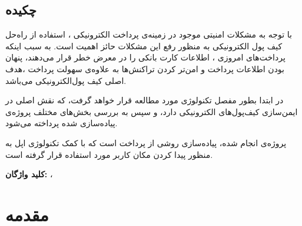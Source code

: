 \documentclass{book}
\begin{document}
 
 \section*{چکیده}
\Large \noindent
با توجه به مشکلات امنیتی موجود در زمینه‌ی پرداخت الکترونیکی ، استفاده از راه‌حل‌ کیف پول الکترونیکی به منظور رفع این مشکلات حائز اهمیت است. به سبب اینکه پرداخت‌های امروزی ، اطلاعات کارت بانکی را در معرض خطر قرار می‌دهند، پنهان بودن اطلاعات پرداخت و امن‌تر کردن تراکنش‌ها به علاوه‌ی سهولت پرداخت ،هدف اصلی کیف پول‌الکترونیکی می‌باشد.

\noindent
در ابتدا بطور مفصل تکنولوژی‌
	{\large {}}
مورد مطالعه قرار خواهد گرفت، که نقش اصلی در ایمن‌سازی کیف‌پول‌های الکترونیکی دارد، و سپس به بررسی بخش‌های مختلف پروژه‌ی پیاده‌سازی شده پرداخته می‌شود.

\noindent
پروژه‌ی انجام شده، پیاده‌سازی روشی از پرداخت است که با کمک تکنولوژی
{\large {}}
اپل به منظور پیدا کردن مکان کاربر مورد استفاده قرار گرفته است.


\vspace*{1cm}
\noindent
\textbf{کلید واژگان: } 
{\large {}} ، {\large {}} 

{\let\cleardoublepage\clearpage 
	\tableofcontents
}
	
	\chapter{مقدمه}\label{chap1}
	
\end{document}
